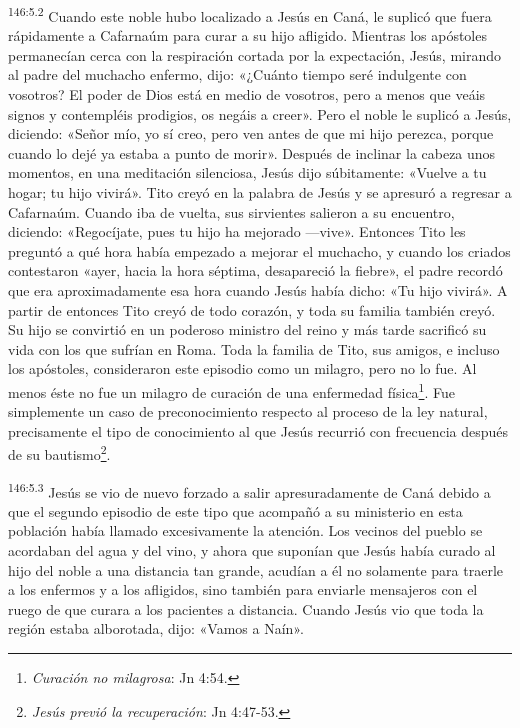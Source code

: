 \par 
\textsuperscript{146:5.2} Cuando este noble hubo localizado a Jesús en Caná, le suplicó que fuera rápidamente a Cafarnaúm para curar a su hijo afligido. Mientras los apóstoles permanecían cerca con la respiración cortada por la expectación, Jesús, mirando al padre del muchacho enfermo, dijo: «¿Cuánto tiempo seré indulgente con vosotros? El poder de Dios está en medio de vosotros, pero a menos que veáis signos y contempléis prodigios, os negáis a creer». Pero el noble le suplicó a Jesús, diciendo: «Señor mío, yo sí creo, pero ven antes de que mi hijo perezca, porque cuando lo dejé ya estaba a punto de morir». Después de inclinar la cabeza unos momentos, en una meditación silenciosa, Jesús dijo súbitamente: «Vuelve a tu hogar; tu hijo vivirá». Tito creyó en la palabra de Jesús y se apresuró a regresar a Cafarnaúm. Cuando iba de vuelta, sus sirvientes salieron a su encuentro, diciendo: «Regocíjate, pues tu hijo ha mejorado ---vive». Entonces Tito les preguntó a qué hora había empezado a mejorar el muchacho, y cuando los criados contestaron «ayer, hacia la hora séptima, desapareció la fiebre», el padre recordó que era aproximadamente esa hora cuando Jesús había dicho: «Tu hijo vivirá». A partir de entonces Tito creyó de todo corazón, y toda su familia también creyó. Su hijo se convirtió en un poderoso ministro del reino y más tarde sacrificó su vida con los que sufrían en Roma. Toda la familia de Tito, sus amigos, e incluso los apóstoles, consideraron este episodio como un milagro, pero no lo fue. Al menos éste no fue un milagro de curación de una enfermedad física\footnote{\textit{Curación no milagrosa}: Jn 4:54.}. Fue simplemente un caso de preconocimiento respecto al proceso de la ley natural, precisamente el tipo de conocimiento al que Jesús recurrió con frecuencia después de su bautismo\footnote{\textit{Jesús previó la recuperación}: Jn 4:47-53.}.

\par 
\textsuperscript{146:5.3} Jesús se vio de nuevo forzado a salir apresuradamente de Caná debido a que el segundo episodio de este tipo que acompañó a su ministerio en esta población había llamado excesivamente la atención. Los vecinos del pueblo se acordaban del agua y del vino, y ahora que suponían que Jesús había curado al hijo del noble a una distancia tan grande, acudían a él no solamente para traerle a los enfermos y a los afligidos, sino también para enviarle mensajeros con el ruego de que curara a los pacientes a distancia. Cuando Jesús vio que toda la región estaba alborotada, dijo: «Vamos a Naín».

